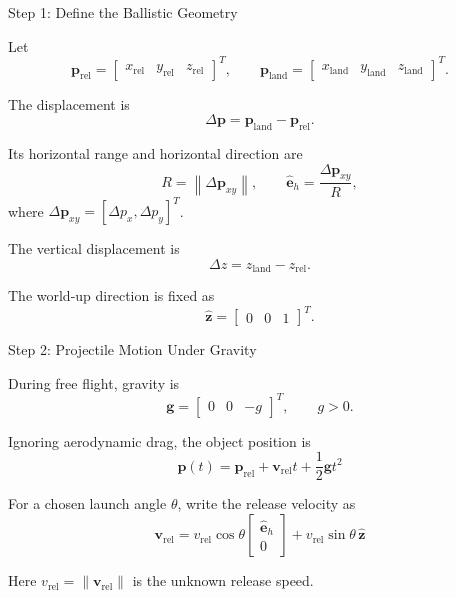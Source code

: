 \documentclass[aspectratio=169]{beamer}
\newcommand{\vect}[1]{\bm{#1}}
\begin{document}
\begin{frame}{Step 1: Define the Ballistic Geometry}

Let
\[
\vect{p}_{\mathrm{rel}}
=\begin{bmatrix}x_{\mathrm{rel}}&y_{\mathrm{rel}}&z_{\mathrm{rel}}\end{bmatrix}^{T},
\qquad
\vect{p}_{\mathrm{land}}
=\begin{bmatrix}x_{\mathrm{land}}&y_{\mathrm{land}}&z_{\mathrm{land}}\end{bmatrix}^{T}.
\]

The displacement is
\[
\Delta\vect{p}=\vect{p}_{\mathrm{land}}-\vect{p}_{\mathrm{rel}}.
\]

Its horizontal range and horizontal direction are
\[
R=\left\|\Delta\vect{p}_{xy}\right\|,
\qquad
\hat{\vect{e}}_{h}
=\frac{\Delta\vect{p}_{xy}}{R},
\]
where $\Delta\vect{p}_{xy}=[\Delta p_x,\Delta p_y]^T$.

The vertical displacement is
\[
\Delta z=z_{\mathrm{land}}-z_{\mathrm{rel}}.
\]

The world-up direction is fixed as
\[
\hat{\vect{z}}=\begin{bmatrix}0&0&1\end{bmatrix}^{T}.
\]

\end{frame}

\begin{frame}{Step 2: Projectile Motion Under Gravity}

During free flight, gravity is
\[
\vect{g}=\begin{bmatrix}0&0&-g\end{bmatrix}^{T},
\qquad g>0.
\]

Ignoring aerodynamic drag, the object position is
\[
\boxed{
\vect{p}(t)
=\vect{p}_{\mathrm{rel}}
+\vect{v}_{\mathrm{rel}}t
+\frac{1}{2}\vect{g}t^2
}
\]

For a chosen launch angle $\theta$, write the release velocity as
\[
\boxed{
\vect{v}_{\mathrm{rel}}
=v_{\mathrm{rel}}\cos\theta
\begin{bmatrix}\hat{\vect{e}}_{h}\\0\end{bmatrix}
+v_{\mathrm{rel}}\sin\theta\,\hat{\vect{z}}
}
\]

Here $v_{\mathrm{rel}}=\|\vect{v}_{\mathrm{rel}}\|$ is the unknown
release speed.

\end{frame}
\end{document}

